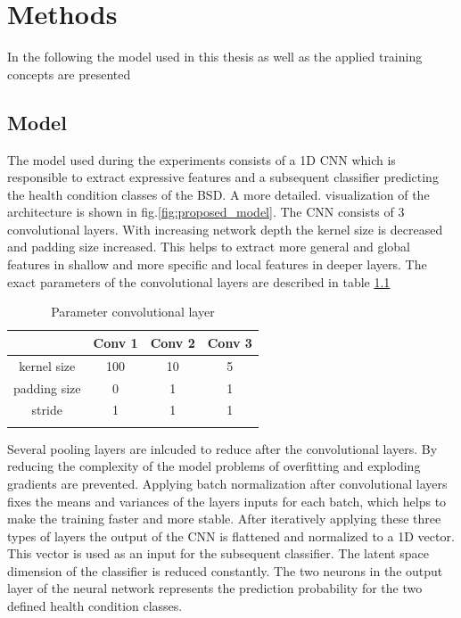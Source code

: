 
\chapter{Methods}\label{chapter:introduction}
In the following the model used in this thesis as well as the applied training concepts are presented

\section{Model}
The model used during the experiments consists of a 1D CNN which is responsible to extract expressive features and a subsequent classifier predicting the health condition classes of the BSD. A more detailed. visualization of the architecture is shown in fig.\ref{fig:proposed_model}. The CNN consists of 3 convolutional layers. With increasing network depth the kernel size is decreased and padding size increased. This helps to extract more general and global features in shallow and more specific and local features in deeper layers. The exact parameters of the convolutional layers are described in table \ref{tab:parameter_conv} 

\begin{longtable}{||c c c c||} 
\hline
& Conv 1 & Conv 2 & Conv 3 \\
\hline
kernel size & 100 & 10 & 5 \\
\hline
padding size & 0 & 1 & 1 \\
\hline
stride & 1 & 1 & 1 \\
\hline
\caption {Parameter convolutional layer}
\label {tab:parameter_conv}
\end{longtable}

Several pooling layers are inlcuded to reduce after the convolutional layers. By reducing the complexity of the model 
problems of overfitting and exploding gradients are prevented. Applying batch normalization after convolutional layers fixes the means and variances of the layers inputs for each batch, which helps to make the training faster and more stable. After iteratively applying these three types of layers the output of the CNN is flattened and normalized to a 1D vector. This vector is used as an input for the subsequent classifier. The latent space dimension  of the classifier is reduced constantly. The two neurons in the output layer of the neural network represents the prediction probability for the two defined health condition classes.



